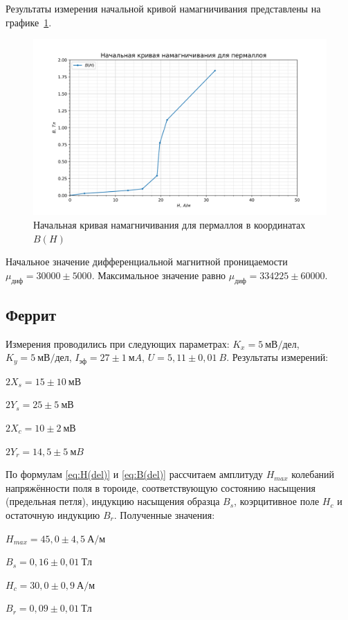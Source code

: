 \documentclass[a4paper, 12pt]{article}
\begin{document}
Результаты измерения начальной кривой намагничивания представлены на графике~\ref{fig:Perm:nach_petlya}.

\begin{figure}[h!]
\begin{center}
    \includegraphics[scale=0.7]{3.4.5_2.png}
\end{center}
\caption{Начальная кривая намагничивания для пермаллоя в координатах $B(H)$}
\label{fig:Perm:nach_petlya}
\end{figure}

Начальное значение дифференциальной магнитной проницаемости \newline $\mu_{диф} = 30000\pm5000$. Максимальное значение равно $\mu_{диф} = 334225\pm60000$.

\subsection{Феррит}

Измерения проводились при следующих параметрах: $K_x = 5~мВ/дел$, $K_y = 5~мВ/дел$, $I_{эф} = 27\pm1~мA$, $U = 5,11\pm0,01~B$. Результаты измерений:
\begin{description}
\item{} $2X_s = 15\pm10~мВ$
\item{} $2Y_s = 25\pm5~мВ$
\item{} $2X_c = 10\pm2~мВ$
\item{} $2Y_r = 14,5\pm5~мB$
\end{description}

По формулам \eqref{eq:H(del)} и \eqref{eq:B(del)} рассчитаем амплитуду $H_{max}$ колебаний напряжённости поля в тороиде, соответствующую состоянию насыщения (предельная петля), индукцию насыщения образца $B_s$, коэрцитивное поле $H_c$ и остаточную индукцию $B_r$. Полученные значения:
\begin{description}
\item{} $H_{max} = 45,0\pm4,5~А/м$
\item{} $B_s = 0,16\pm0,01~Тл$
\item{} $H_c = 30,0\pm0,9~А/м$
\item{} $B_r = 0,09\pm0,01~Тл$
\end{description}
\end{document}
